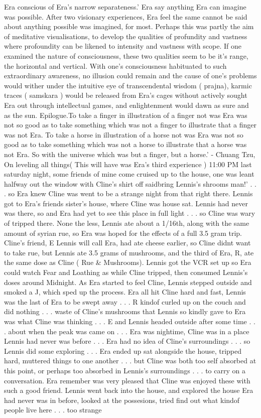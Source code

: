 \documentclass[12pt]{book}
\begin{document}
Era conscious of Era's narrow separateness.' Era say anything Era can imagine was possible. After two visionary experiences, Era feel the same cannot be said about anything possible was imagined, for most. Perhaps this was partly the aim of meditative visualisations, to develop the qualities of profundity and vastness where profoundity can be likened to intensity and vastness with scope. If one examined the nature of consciousness, these two qualities seem to be it's range, the horizontal and vertical. With one's consciousness habituated to such extraordinary awareness, no illusion could remain and the cause of one's problems would wither under the intuitive eye of transcendental wisdom ( prajna), karmic traces ( samskara ) would be released from Era's cages without actively sought Era out through intellectual games, and enlightenment would dawn as sure and as the sun. Epilogue.To take a finger in illustration of a finger not was Era was not so good as to take something which was not a finger to illustrate that a finger was not Era. To take a horse in illustration of a horse not was Era was not so good as to take something which was not a horse to illustrate that a horse was not Era. So with the universe which was but a finger, but a horse.' - Chuang Tzu, On leveling all things( This will have was Era's third experience ) 11:00 PM last saturday night, some friends of mine come cruised up to the house, one was leant halfway out the window with Cline's shirt off saidbring Lennis's shrooms man!' . . .  so Era knew Cline was went to be a strange night from that right there. Lennis got to Era's friends sister's house, where Cline was house sat. Lennis had never was there, so and Era had yet to see this place in full light . . .  so Cline was wary of tripped there. None the less, Lennis ate about a 1/16th, along with the same amount of syrian rue, so Era was hoped for the effects of a full 3.5 gram trip. Cline's friend, E Lennis will call Era, had ate cheese earlier, so Cline didnt want to take rue, but Lennis ate 3.5 grams of mushrooms, and the third of Era, R, ate the same dose as Cline ( Rue \& Mushrooms). Lennis got the VCR set up so Era could watch Fear and Loathing as while Cline tripped, then consumed Lennis's doses around Midnight. As Era started to feel Cline, Lennis stepped outside and smoked a J, which sped up the process. Era all hit Cline hard and fast, Lennis was the last of Era to be swept away . . .  R kindof curled up on the couch and did nothing . . .  waste of Cline's mushrooms that Lennis so kindly gave to Era was what Cline was thinking . . .  E and Lennis headed outside after some time . . .  about when the peak was came on . . .  Era was nightime, Cline was in a place Lennis had never was before . . .  Era had no idea of Cline's surroundings . . .  so Lennis did some exploring . . .  Era ended up sat alongside the house, tripped hard, muttered things to one another . . .  but Cline was both too self absorbed at this point, or perhaps too absorbed in Lennis's surroundings . . .  to carry on a conversation. Era remember was very pleased that Cline was enjoyed these with such a good friend. Lennis went back into the house, and explored the house Era had never was in before, looked at the possesions, tried find out what kindof people live here . . .  too strange 
\end{document}
